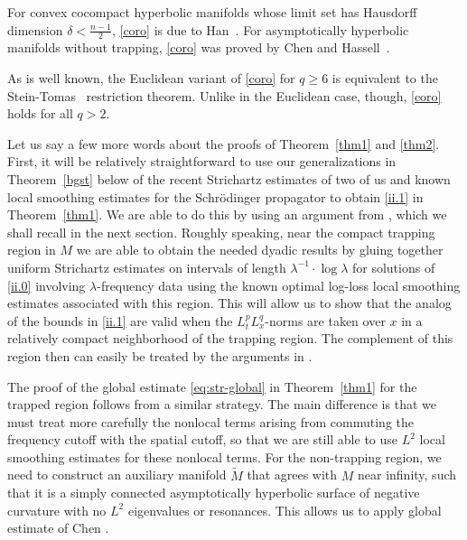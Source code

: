 \documentclass[10pt]{amsart}
\newcommand{\la}{\lambda}
\newcommand{\1}{{\bf 1}}
\newcommand{\blue}{\color{blue}}
\begin{document}
For convex cocompact hyperbolic manifolds whose limit set has Hausdorff dimension $\delta < \frac{n-1}{2}$, \eqref{coro} is due to Han~\cite[Theorem 2]{han2021tomas}. For asymptotically hyperbolic manifolds without trapping, \eqref{coro} was proved by Chen and Hassell~\cite[Theorem 1.6]{ChHa}.


As is well known, the Euclidean variant of \eqref{coro} for $q\ge 6$ is equivalent to the Stein-Tomas~\cite{Tomas} restriction theorem.  Unlike in the Euclidean case, though, \eqref{coro} holds for 
all $q>2$.






Let us say a few more words about the proofs of Theorem~\ref{thm1} and \ref{thm2}.   First, it will be relatively straightforward to use
our generalizations in Theorem~\ref{bgst} below of the recent Strichartz estimates of two of us \cite{HSst} and known
local smoothing estimates for the Schr\"odinger propagator to obtain \eqref{ii.1} in Theorem~\ref{thm1}.  We are able to do this 
by using an argument from \cite{BGH}, which we shall recall in the next section.  Roughly speaking, near the compact
trapping region in $M$ we are able to obtain the needed dyadic results by gluing together uniform Strichartz estimates
on intervals of length $\la^{-1}\cdot \log\la$ for solutions of \eqref{ii.0} involving $\la$-frequency data using the known optimal
log-loss local smoothing estimates associated with this region.   This will allow us to show that the analog of the bounds in \eqref{ii.1}
are valid when the $L^p_tL^q_x$-norms are taken over $x$ in a relatively compact neighborhood of the trapping region.
The complement of this region then can easily be treated by the arguments in \cite{BGH}. 

The proof of the global estimate \eqref{eq:str-global} in Theorem~\ref{thm1} for the trapped region follows from a similar strategy. The main difference is that we must treat more carefully the nonlocal terms arising from commuting the frequency cutoff with the spatial cutoff, so that we are still able to use  $L^2$ local smoothing estimates for these nonlocal terms.
For the non-trapping region, 
we need to construct an auxiliary manifold $\tilde M$ that agrees with $M$ near infinity, such that it is a simply connected asymptotically hyperbolic surface of negative curvature with no $L^2$ eigenvalues or resonances. This allows us to apply global estimate of Chen \cite{ChenSt}. 
\end{document}
